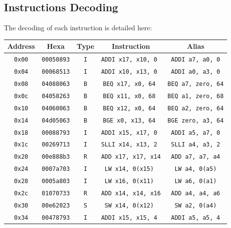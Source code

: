 \documentclass[a4paper,12pt]{article}
\begin{document}
\subsection{Instructions Decoding}
The decoding of each instruction is detailed here:
\begin{longtable}{|c|c|c|c|c|}
\hline
\textbf{Address} & \textbf{Hexa} & \textbf{Type} & \textbf{Instruction} & \textbf{Alias} \\ \hline
\texttt{0x00} & \texttt{00050893} & \texttt{I} & \texttt{ADDI x17, x10, 0  }  & \texttt{ADDI a7, a0, 0} \\ \hline
\texttt{0x04} & \texttt{00068513} & \texttt{I} & \texttt{ADDI x10, x13, 0  }  & \texttt{ADDI a0, a3, 0} \\ \hline
\texttt{0x08} & \texttt{04088063} & \texttt{B} & \texttt{BEQ  x17, x0, 64 }  & \texttt{BEQ  a7, zero, 64} \\ \hline
\texttt{0x0c} & \texttt{04058263} & \texttt{B} & \texttt{BEQ  x11, x0, 68 }  & \texttt{BEQ  a1, zero, 68} \\ \hline
\texttt{0x10} & \texttt{04060063} & \texttt{B} & \texttt{BEQ  x12, x0, 64 }  & \texttt{BEQ  a2, zero, 64} \\ \hline
\texttt{0x14} & \texttt{04d05063} & \texttt{B} & \texttt{BGE  x0, x13, 64 }  & \texttt{BGE  zero, a3, 64} \\ \hline
\texttt{0x18} & \texttt{00088793} & \texttt{I} & \texttt{ADDI x15, x17, 0  }  & \texttt{ADDI a5, a7, 0} \\ \hline
\texttt{0x1c} & \texttt{00269713} & \texttt{I} & \texttt{SLLI x14, x13, 2  }  & \texttt{SLLI a4, a3, 2} \\ \hline
\texttt{0x20} & \texttt{00e888b3} & \texttt{R} & \texttt{ADD  x17, x17, x14}  & \texttt{ADD  a7, a7, a4} \\ \hline
\texttt{0x24} & \texttt{0007a703} & \texttt{I} & \texttt{LW   x14, 0(x15)  }  & \texttt{LW   a4, 0(a5)} \\ \hline
\texttt{0x28} & \texttt{0005a803} & \texttt{I} & \texttt{LW   x16, 0(x11)  }  & \texttt{LW   a6, 0(a1)} \\ \hline
\texttt{0x2c} & \texttt{01070733} & \texttt{R} & \texttt{ADD  x14, x14, x16}  & \texttt{ADD  a4, a4, a6} \\ \hline
\texttt{0x30} & \texttt{00e62023} & \texttt{S} & \texttt{SW   x14, 0(x12)  }  & \texttt{SW   a2, 0(a4)} \\ \hline
\texttt{0x34} & \texttt{00478793} & \texttt{I} & \texttt{ADDI x15, x15, 4  }  & \texttt{ADDI a5, a5, 4} \\ \hline

\end{longtable}
\end{document}
